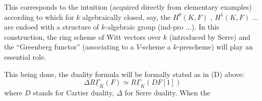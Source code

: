This corresponds to the intuition (acquired directly from elementary
examples) according to which for $k$ algebraically closed, say, the
$H^0(K, F)$ , $H^1(K, F)$ ... are endoed with a structure of $k$-algebraic group
(ind-pro ...). In this construction, the ring scheme of Witt vectors over
$k$ (introduced by Serre) and the ``Greenberg functor'' (associating to a
$V$-scheme a $k$-prescheme) will play an essential role.

This being done, the duality formula will be formally stated as in (D)
above:
\[ \Delta R\underline{\Gamma}_K(F) \simeq R\underline{\Gamma}_K(DF[1]) \]
where $D$ stands for Cartier duality, $\Delta$ for Serre duality. When the

